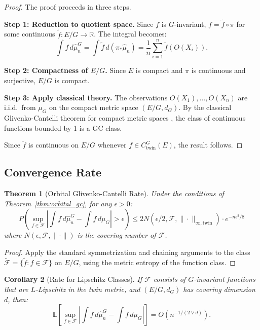 \documentclass[11pt]{article}
\newtheorem{theorem}{Theorem}[section]
\newtheorem{corollary}[theorem]{Corollary}
\newcommand{\R}{\mathbb{R}}
\newcommand{\E}{\mathbb{E}}
\begin{document}
\begin{proof}
The proof proceeds in three steps.

\textbf{Step 1: Reduction to quotient space.} Since $f$ is $G$-invariant, $f = \tilde{f} \circ \pi$ for some continuous $\tilde{f} : E/G \to \R$. The integral becomes:
\begin{equation}
\int f \, d\hat{\mu}_n^G = \int \tilde{f} \, d(\pi_* \hat{\mu}_n) = \frac{1}{n} \sum_{i=1}^n \tilde{f}(O(X_i)).
\end{equation}

\textbf{Step 2: Compactness of $E/G$.} Since $E$ is compact and $\pi$ is continuous and surjective, $E/G$ is compact.

\textbf{Step 3: Apply classical theory.} The observations $O(X_1), \ldots, O(X_n)$ are i.i.d.\ from $\mu_G$ on the compact metric space $(E/G, d_G)$. By the classical Glivenko-Cantelli theorem for compact metric spaces \citep{Dudley1999}, the class of continuous functions bounded by 1 is a GC class.

Since $\tilde{f}$ is continuous on $E/G$ whenever $f \in C_{\mathrm{twin}}^G(E)$, the result follows.
\end{proof}

\subsection{Convergence Rate}

\begin{theorem}[Orbital Glivenko-Cantelli Rate]\label{thm:gc_rate}
Under the conditions of Theorem~\ref{thm:orbital_gc}, for any $\epsilon > 0$:
\begin{equation}\label{eq:gc_rate}
P\left( \sup_{f \in \mathcal{F}} \left| \int f \, d\hat{\mu}_n^G - \int f \, d\mu_G \right| > \epsilon \right) \leq 2 N(\epsilon/2, \mathcal{F}, \|\cdot\|_{\infty,\mathrm{twin}}) \cdot e^{-n\epsilon^2/8}
\end{equation}
where $N(\epsilon, \mathcal{F}, \|\cdot\|)$ is the covering number of $\mathcal{F}$.
\end{theorem}

\begin{proof}
Apply the standard symmetrization and chaining arguments \citep{vanderVaartWellner1996} to the class $\tilde{\mathcal{F}} = \{\tilde{f} : f \in \mathcal{F}\}$ on $E/G$, using the metric entropy of the function class.
\end{proof}

\begin{corollary}[Rate for Lipschitz Classes]\label{cor:lipschitz_rate}
If $\mathcal{F}$ consists of $G$-invariant functions that are $L$-Lipschitz in the twin metric, and $(E/G, d_G)$ has covering dimension $d$, then:
\begin{equation}\label{eq:lipschitz_rate}
\E\left[ \sup_{f \in \mathcal{F}} \left| \int f \, d\hat{\mu}_n^G - \int f \, d\mu_G \right| \right] = O\left( n^{-1/(2 \vee d)} \right).
\end{equation}
\end{corollary}
\end{document}
